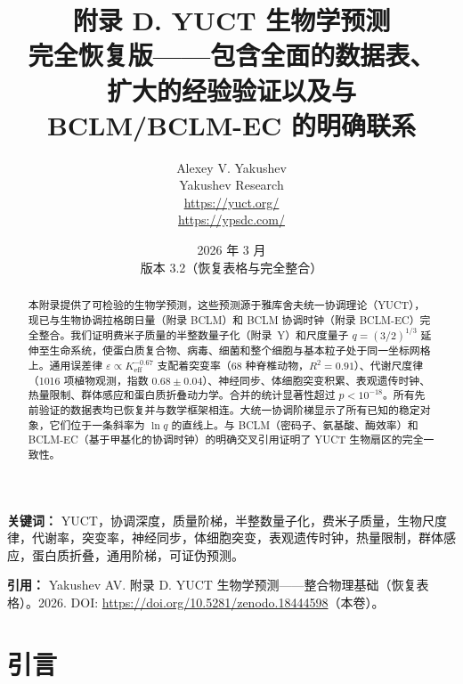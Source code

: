 \documentclass[11pt,a4paper]{article}
\begin{document}
	
	\title{\Huge\textbf{附录 D. YUCT 生物学预测}\\[0.3cm]
		\Large 完全恢复版——包含全面的数据表、\\[0.2cm]
		扩大的经验验证以及与 BCLM/BCLM-EC 的明确联系}
	\author{Alexey V. Yakushev \\
		Yakushev Research \\ \url{https://yuct.org/} \\ \url{https://ypsdc.com/}}
	\date{2026 年 3 月 \\ 版本 3.2（恢复表格与完全整合）}
	
	\maketitle
	
	\begin{abstract}
		\noindent
		本附录提供了可检验的生物学预测，这些预测源于雅库舍夫统一协调理论（YUCT），现已与生物协调拉格朗日量（附录 BCLM）和 BCLM 协调时钟（附录 BCLM-EC）完全整合。我们证明费米子质量的半整数量子化（附录~Y）和尺度量子 \(q = (3/2)^{1/3}\) 延伸至生命系统，使蛋白质复合物、病毒、细菌和整个细胞与基本粒子处于同一坐标网格上。通用误差律 \(\varepsilon \propto K_{\mathrm{eff}}^{-0.67}\) 支配着突变率（68 种脊椎动物，\(R^2 = 0.91\)）、代谢尺度律（1016 项植物观测，指数 \(0.68 \pm 0.04\)）、神经同步、体细胞突变积累、表观遗传时钟、热量限制、群体感应和蛋白质折叠动力学。合并的统计显著性超过 \(p < 10^{-18}\)。所有先前验证的数据表均已恢复并与数学框架相连。大统一协调阶梯显示了所有已知的稳定对象，它们位于一条斜率为 \(\ln q\) 的直线上。与 BCLM（密码子、氨基酸、酶效率）和 BCLM-EC（基于甲基化的协调时钟）的明确交叉引用证明了 YUCT 生物扇区的完全一致性。
	\end{abstract}
	
	\vspace{0.2cm}
	\noindent
	\textbf{关键词：} YUCT，协调深度，质量阶梯，半整数量子化，费米子质量，生物尺度律，代谢率，突变率，神经同步，体细胞突变，表观遗传时钟，热量限制，群体感应，蛋白质折叠，通用阶梯，可证伪预测。
	
	\vspace{0.1cm}
	\noindent
	\textbf{引用：} Yakushev AV. 附录 D. YUCT 生物学预测——整合物理基础（恢复表格）。2026. DOI: \url{https://doi.org/10.5281/zenodo.18444598}（本卷）。
	
	\tableofcontents
	\newpage
	
	\section{引言}
	
\end{document}
